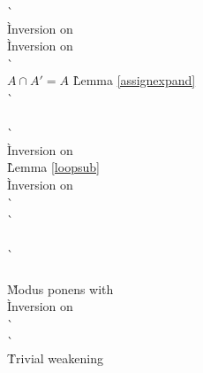 \begin{description}
\begin{tabbing}
    \`  \\

    \` Inversion on  \\
    \` Inversion on  \\
    \`  \\
  $A \cap A' = A$
    \` Lemma \ref{assignexpand} \\
    \`  \\
  \\

    \`  \\

    \` Inversion on  \\
    \` Lemma \ref{loopsub} \\
    \` Inversion on  \\
    \`  \\
    \`  \\
  \\

    \`  \\

   \\
    \` Modus ponens with  \\
    \` Inversion on  \\
    \`  \\
    \`  \\
    \` Trivial weakening \\


\end{tabbing}
\end{description}
